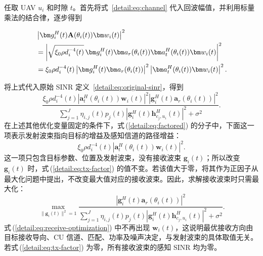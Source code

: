 任取 UAV $u_i$ 和时隙 $t$。首先将式~\eqref{detail:eq:channel} 代入回波幅值，并利用标量乘法的结合律，逐步得到
\begin{samepage}
\begin{align}
&\left|\bm g_i^H(t)\mathbf A(\theta_i(t))\bm w_i(t)\right|^2\notag\\
&=\left|\sqrt{\xi_0\rho d_i^{-4}(t)}\,
\bm g_i^H(t)\bm a_r(\theta_i(t))\bm a_t^H(\theta_i(t))\bm w_i(t)\right|^2\notag\\
&=\xi_0\rho d_i^{-4}(t)
\left|\bm g_i^H(t)\bm a_r(\theta_i(t))\right|^2
\left|\bm a_t^H(\theta_i(t))\bm w_i(t)\right|^2.\label{detail:eq:factor}
\end{align}
\end{samepage}
将上式代入原始 SINR 定义~\eqref{detail:eq:original-sinr}，得到
\begin{equation}\label{detail:eq:factored}
\frac{\xi_0\rho d_i^{-4}(t)
\left|\bm a_t^H(\theta_i(t))\bm w_i(t)\right|^2
\left|\bm g_i^H(t)\bm a_r(\theta_i(t))\right|^2}
{\displaystyle\sum_{j=1}^J\eta_{i,j}(t)p_j(t)
\left|\bm g_i^H(t)\bm h_{c_j,u_i}^{H}(t)\right|^2+\sigma^2}.
\end{equation}
在上述其他优化变量固定的条件下，式\,(\ref{detail:eq:factored}) 的分子中，下面这一项表示发射波束指向目标的增益及感知信道的路径增益：
\begin{equation}\label{detail:eq:tx-factor}
\xi_0\rho d_i^{-4}(t)
\left|\bm a_t^H(\theta_i(t))\bm w_i(t)\right|^2.
\end{equation}
这一项只包含目标参数、位置及发射波束，没有接收波束 $\bm g_i(t)$；所以改变 $\bm g_i(t)$ 时，式\,(\ref{detail:eq:tx-factor}) 的值不变。若该值大于零，将其作为正因子从最大化问题中提出，不改变最大值对应的接收波束。因此，求解接收波束时只需最大化：
\begin{equation}\label{detail:eq:receive-optimization}
\max_{\|\bm g_i(t)\|^2=1}
\frac{\left|\bm g_i^H(t)\bm a_r(\theta_i(t))\right|^2}
{\displaystyle\sum_{j=1}^J\eta_{i,j}(t)p_j(t)
\left|\bm g_i^H(t)\bm h_{c_j,u_i}^{H}(t)\right|^2+\sigma^2}.
\end{equation}
式\,(\ref{detail:eq:receive-optimization}) 中不再出现 $\bm w_i(t)$，这说明最优接收方向由目标接收导向、CU 信道、匹配、功率及噪声决定，与发射波束的具体取值无关。若式\,(\ref{detail:eq:tx-factor}) 为零，所有接收波束的感知 SINR 均为零。

